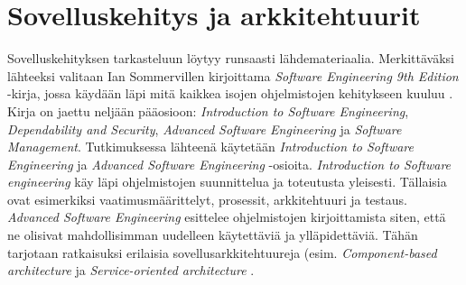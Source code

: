 \documentclass[utf8]{gradu3}
\begin{document}
\section{Sovelluskehitys ja arkkitehtuurit}
Sovelluskehityksen tarkasteluun löytyy runsaasti lähdemateriaalia. Merkittäväksi lähteeksi valitaan Ian Sommervillen kirjoittama \textit{Software Engineering 9th Edition} -kirja, jossa käydään läpi mitä kaikkea isojen ohjelmistojen kehitykseen kuuluu \parencite{Sommerville}. Kirja on jaettu neljään pääosioon: \textit{Introduction to Software Engineering}, \textit{Dependability and Security}, \textit{Advanced Software Engineering} ja \textit{Software Management}. Tutkimuksessa lähteenä käytetään \textit{Introduction to Software Engineering} ja \textit{Advanced Software Engineering} -osioita. \textit{Introduction to Software engineering} käy läpi ohjelmistojen suunnittelua ja toteutusta yleisesti. Tällaisia ovat esimerkiksi vaatimusmäärittelyt, prosessit, arkkitehtuuri ja testaus. \textit{Advanced Software Engineering} esittelee ohjelmistojen kirjoittamista siten, että ne olisivat mahdollisimman uudelleen käytettäviä ja ylläpidettäviä. Tähän tarjotaan ratkaisuksi erilaisia sovellusarkkitehtuureja (esim.  \textit{Component-based architecture} ja \textit{Service-oriented architecture} \parencite{Sommerville}.
\end{document}

